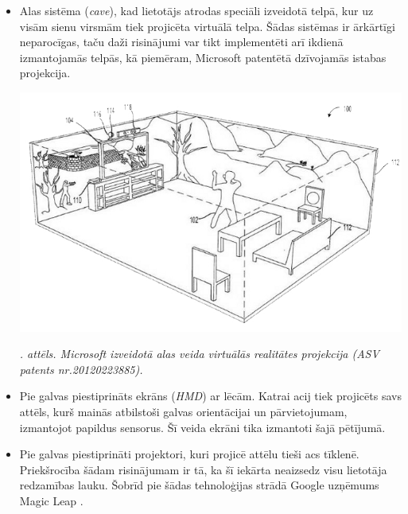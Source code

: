 \documentclass[12pt, a4paper, oneside, openright]{article}
\renewcommand{\thecimages}{\arabic{cimages}}
\begin{document}
\begin{itemize}
\item Alas sistēma (\textit{cave}), kad lietotājs atrodas speciāli
izveidotā telpā, kur uz visām sienu virsmām tiek projicēta virtuālā telpa. Šādas
sistēmas ir ārkārtīgi neparocīgas, taču daži risinājumi var tikt implementēti arī
ikdienā izmantojamās telpās, kā piemēram, Microsoft patentētā dzīvojamās istabas projekcija.

\label{cimages:cave}
\vspace{10pt}
\begin{samepage}
\begin{center}
\includegraphics[width=0.6\columnwidth]{images/cave.jpg}
\begin{center}
\footnotesize{
\textit{\thecimages. attēls. Microsoft izveidotā alas veida virtuālās realitātes projekcija (ASV patents nr.20120223885).}}
\end{center}
\end{center}
\end{samepage}



\item Pie galvas piestiprināts ekrāns (\textit{HMD}) ar lēcām. Katrai acij tiek projicēts savs
attēls, kurš mainās atbilstoši galvas orientācijai un pārvietojumam, izmantojot papildus sensorus.
Šī veida ekrāni tika izmantoti šajā pētījumā.


\item Pie galvas piestiprināti projektori, kuri projicē attēlu tieši acs tīklenē. Priekšrocība 
šādam risinājumam ir tā, ka šī iekārta neaizsedz visu lietotāja redzamības lauku. Šobrīd
pie šādas tehnoloģijas strādā Google uzņēmums Magic Leap \cite{SebastianAnthony2014} \cite{PaulRidden2013}.


\end{itemize}
\end{document}

